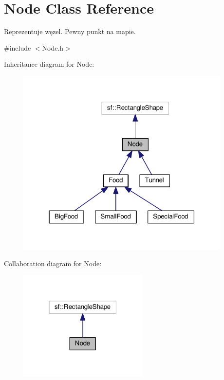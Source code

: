 \hypertarget{classNode}{}\section{Node Class Reference}
\label{classNode}


Reprezentuje węzel. Pewny punkt na mapie.  




{\ttfamily \#include $<$Node.\+h$>$}



Inheritance diagram for Node\+:\nopagebreak
\begin{figure}[H]
\begin{center}
\leavevmode
\includegraphics[width=303pt]{classNode__inherit__graph}
\end{center}
\end{figure}


Collaboration diagram for Node\+:\nopagebreak
\begin{figure}[H]
\begin{center}
\leavevmode
\includegraphics[width=183pt]{classNode__coll__graph}
\end{center}
\end{figure}

